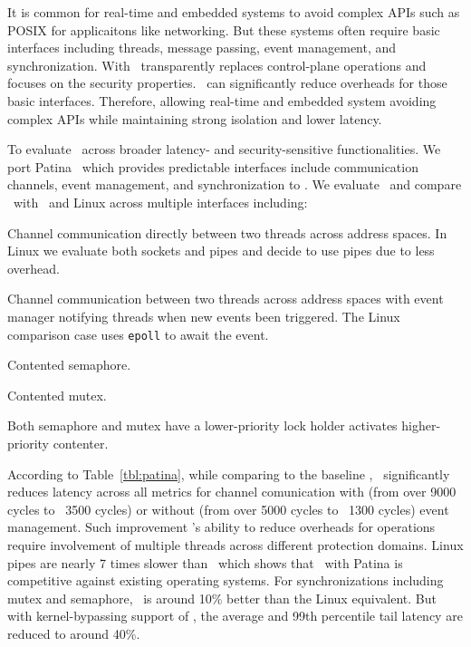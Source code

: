 It is common for real-time and embedded systems to avoid complex APIs such as POSIX for applicaitons like networking.
But these systems often require basic interfaces including threads, message passing, event management, and synchronization.
With \name\ transparently replaces control-plane operations and focuses on the security properties.
\name\ can significantly reduce overheads for those basic interfaces.
Therefore, allowing real-time and embedded system avoiding complex APIs while maintaining strong isolation and lower latency.

To evaluate \name\ across broader latency- and security-sensitive functionalities.
We port Patina~\cite{patina} which provides predictable interfaces include communication channels, event management, and synchronization to \name .
We evaluate \name\ and compare \name\ with \cos\ and Linux across multiple interfaces including: 
\begin{inparaenum}[(1)]
\item Channel communication directly between two threads across address spaces.
	In Linux we evaluate both sockets and pipes and decide to use pipes due to less overhead.
\item Channel communication between two threads across address spaces with event manager notifying threads when new events been triggered.
	The Linux comparison case uses {\tt epoll} to await the event.
\item Contented semaphore.
\item Contented mutex.
\end{inparaenum}
Both semaphore and mutex have a lower-priority lock holder activates higher-priority contenter.



According to Table~\ref{tbl:patina}, while comparing to the baseline \cos , \name\ significantly reduces latency across all metrics for channel comunication with (from over 9000 cycles to ~3500 cycles) or without (from over 5000 cycles to ~1300 cycles) event management.
Such improvement \name 's ability to reduce overheads for operations require involvement of multiple threads across different protection domains.
Linux pipes are nearly 7 times slower than \name\ which shows that \name\ with Patina is competitive against existing operating systems.
For synchronizations including mutex and semaphore, \cos\ is around 10\% better than the Linux equivalent.
But with kernel-bypassing support of \name , the average and 99th percentile tail latency are reduced to around 40\%.

